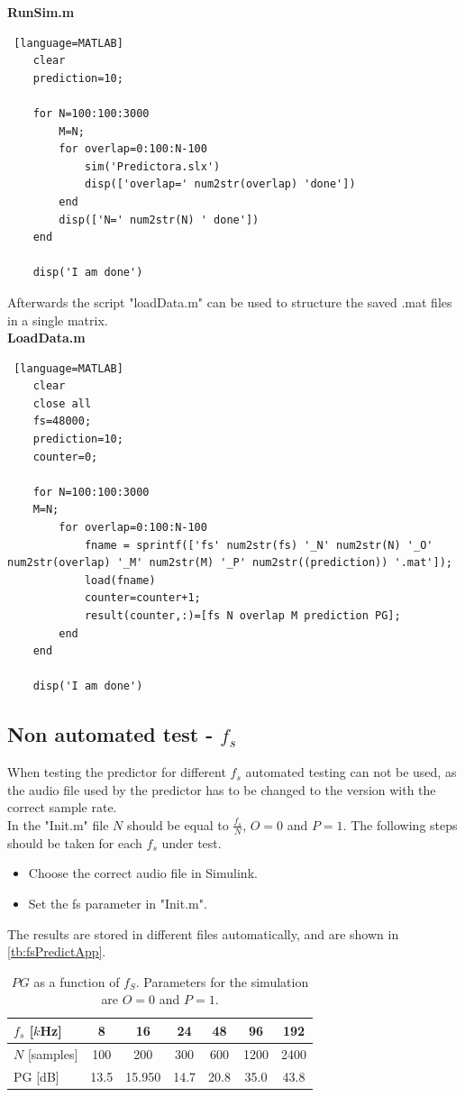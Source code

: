 \textbf{RunSim.m}
\begin{lstlisting} [language=MATLAB]
	clear 
	prediction=10;
	
	for N=100:100:3000
		M=N;
		for overlap=0:100:N-100
			sim('Predictora.slx')
			disp(['overlap=' num2str(overlap) 'done'])
		end
		disp(['N=' num2str(N) ' done'])
	end
	
	disp('I am done')	
\end{lstlisting}


Afterwards the script "loadData.m" can be used to structure the saved .mat  files in a single matrix.\\
\textbf{LoadData.m}
\begin{lstlisting} [language=MATLAB]
	clear
	close all
	fs=48000;
	prediction=10;
	counter=0;
	
	for N=100:100:3000
	M=N;
		for overlap=0:100:N-100
			fname = sprintf(['fs' num2str(fs) '_N' num2str(N) '_O' num2str(overlap) '_M' num2str(M) '_P' num2str((prediction)) '.mat']);
			load(fname)
			counter=counter+1;
			result(counter,:)=[fs N overlap M prediction PG]; 
		end
	end
	
	disp('I am done')
\end{lstlisting}

\subsection{Non automated test - $f_s$}
When testing the predictor for different $f_s$ automated testing can not be used, as the audio file used by the predictor has to be changed to the version with the correct sample rate. \\ 
In the "Init.m" file $N$ should be equal to $\frac{f_s}{N}$, $O=0$ and $P=1$. The following steps should be taken for each $f_s$ under test.
\begin{itemize}
	\item Choose the correct audio file in Simulink. 
	\item Set the fs parameter in "Init.m". 
\end{itemize}
The results are stored in different files automatically, and are shown in \autoref{tb:fsPredictApp}.

\begin{table}[H]
\centering
\begin{tabular}{|l|c|c|c|c|c|c|}
	\hline
	$f_s$ {[}$k$Hz{]} & 8 & 16 & 24 & 48 & 96 & 192 \\ \hline 
	$N$ {[}samples{]} & 100 & 200 & 300 & 600 & 1200 & 2400 \\ \hline 
	PG {[}dB{]} & 13.5 & 15.950 & 14.7 & 20.8 & 35.0 & 43.8 \\ \hline
\end{tabular}
\caption{$PG$ as a function of $f_S$. Parameters for the simulation are $O=0$ and $P=1$.}
\label{tb:fsPredictApp}
\end{table}  
 
